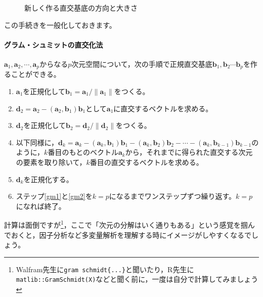 \documentclass{ltjsbook}
\begin{document}
\begin{figure}
	\centering
	\caption{新しく作る直交基底の方向と大きさ}
	\label{GrammSchmidt}
\end{figure}
この手続きを一般化しておきます。

\paragraph{グラム・シュミットの直交化法}$\bm{a}_1,\bm{a}_2,\cdots,\bm{a}_p$からなる$p$次元空間について，次の手順で正規直交基底$\bm{b}_1,\bm{b}_2 \cdots \bm{b}_p$を作ることができる。
\begin{enumerate}
	\item $\bm{a}_1$を正規化して$\bm{b}_1= \bm{a}_1 / \|\bm{a}_1\|$をつくる。
	\item $\bm{d}_2 = \bm{a}_2 - (\bm{a}_2,\bm{b}_1)\bm{b}_1$として$\bm{a}_1$に直交するベクトルを求める。
	\item $\bm{d}_2$を正規化して$\bm{b}_2= \bm{d}_2 / \| \bm{d}_2 \|$をつくる。
	\item 以下同様に，$\bm{d}_k = \bm{a}_k - (\bm{a}_k,\bm{b}_1)\bm{b}_1 - (\bm{a}_k,\bm{b}_2)\bm{b}_2 - \cdots -(\bm{a}_k,\bm{b}_{k-1})\bm{b}_{k-1}$のように，$k$番目のもとのベクトル$\bm{a}_k$から，それまでに得られた直交する次元の要素を取り除いて，$k$番目の直交するベクトルを求める。\label{gm1}
	\item $\bm{d}_k$を正規化する。\label{gm2}
	\item ステップ\ref{gm1}と\ref{gm2}を$k=p$になるまでワンステップずつ繰り返す。$k=p$になれば終了。
\end{enumerate}

計算は面倒ですが\footnote{Walfram先生に\verb|gram schmidt{...}|と聞いたり，R先生に\verb|matlib::GramSchmidt(X)|などと聞く前に，一度は自分で計算してみましょう}，ここで「次元の分解はいく通りもある」という感覚を掴んでおくと，因子分析など多変量解析を理解する時にイメージがしやすくなるでしょう。
\end{document}
